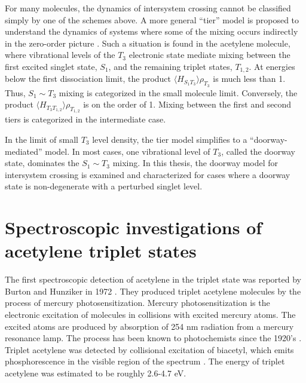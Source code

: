 For many molecules, the dynamics of intersystem crossing cannot be
classified simply by one of the schemes above.  A more general
``tier'' model is proposed to understand the dynamics of systems where
some of the mixing occurs indirectly in the zero-order picture
\cite{stuchebrukhov93a, stuchebrukhov93b}.  Such a situation is found
in the acetylene molecule, where vibrational levels of the $T_3$
electronic state mediate mixing between the first excited singlet
state, $S_1$, and the remaining triplet states, $T_{1,2}$.  At
energies below the first dissociation limit, the product $\langle
H_{S_1 T_3} \rangle \rho_{T_3}$ is much less than 1.  Thus, $S_1 \sim
T_3$ mixing is categorized in the small molecule limit.  Conversely,
the product $\langle H_{T_3 T_{1,2}} \rangle \rho_{T_{1,2}}$ is on the
order of 1.  Mixing between the first and second tiers is categorized
in the intermediate case.

In the limit of small $T_3$ level density, the tier model simplifies
to a ``doorway-mediated'' model.  In most cases, one vibrational level
of $T_3$, called the doorway state, dominates the $S_1 \sim T_3$
mixing.  In this thesis, the doorway model for intersystem crossing is
examined and characterized for cases where a doorway state is
non-degenerate with a perturbed singlet level.

\section{Spectroscopic investigations of acetylene triplet states}

The first spectroscopic detection of acetylene in the triplet state
was reported by Burton and Hunziker in 1972 \cite{burton72}.  They
produced triplet acetylene molecules by the process of mercury
photosensitization.  Mercury photosensitization is the electronic
excitation of molecules in collisions with excited mercury atoms.  The
excited atoms are produced by absorption of 254 nm radiation from a
mercury resonance lamp.  The process has been known to photochemists
since the 1920's \cite{calvert66, cairo22}.  Triplet acetylene was
detected by collisional excitation of biacetyl, which emits
phosphorescence in the visible region of the spectrum \cite{burton72}.
The energy of triplet acetylene was estimated to be roughly 2.6-4.7
eV.

